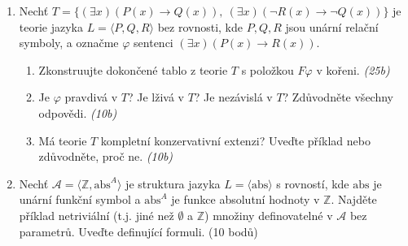 \documentclass[a4paper]{article}
\begin{document}
\begin{enumerate}
\smallskip

\item Nechť $T=\{(\exists x)(P(x)\to Q(x)),\ (\exists x)(\neg R(x)\to \neg Q(x))\}$ je teorie jazyka $L=\langle P,Q,R\rangle$ bez rovnosti, kde $P,Q,R$ jsou unární relační symboly, a označme $\varphi$ sentenci $(\exists x)(P(x) \to R(x))$.
\begin{enumerate}
    \item Zkonstruujte dokončené tablo z teorie $T$ s položkou $F\varphi$ v kořeni. {\it (25b)}
    \item Je $\varphi$ pravdivá v $T$? Je lživá v $T$? Je nezávislá v $T$? Zdůvodněte všechny odpovědi. {\it (10b)}
    \item Má teorie $T$ kompletní konzervativní extenzi? Uveďte příklad nebo zdůvodněte, proč ne. {\it (10b)}
\end{enumerate}

\smallskip

\item Nechť $\mathcal{A}=\langle\mathbb{Z},\mathrm{abs}^A \rangle$ je struktura jazyka $L=\langle \mathrm{abs} \rangle$ s rovností, kde $\mathrm{abs}$ je unární funkční symbol a $\mathrm{abs}^A$ je funkce absolutní hodnoty v $\mathbb{Z}$. Najděte příklad netriviální (t.j. jiné než $\emptyset$ a $\mathbb{Z}$) množiny definovatelné v $\mathcal{A}$ bez parametrů. Uveďte definující formuli. (10 bodů)
\end{enumerate}
\end{document}

